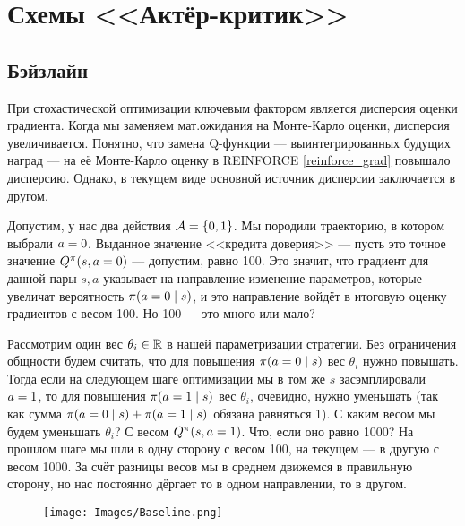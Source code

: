 \section{Схемы <<Актёр-критик>>}\label{ActorCriticSection}

\subsection{Бэйзлайн}

При стохастической оптимизации ключевым фактором является дисперсия оценки градиента. Когда мы заменяем мат.ожидания на Монте-Карло оценки, дисперсия увеличивается. Понятно, что замена Q-функции --- выинтегрированных будущих наград --- на её Монте-Карло оценку в REINFORCE \eqref{reinforce_grad} повышало дисперсию. Однако, в текущем виде основной источник дисперсии заключается в другом.

\begin{example}
Допустим, у нас два действия $\mathcal{A} = \{0, 1\}$. Мы породили траекторию, в котором выбрали $a \HM= 0$. Выданное значение <<кредита доверия>> --- пусть это точное значение $Q^{\pi}(s, a \HM= 0)$ --- допустим, равно 100. Это значит, что градиент для данной пары $s, a$ указывает на направление изменение параметров, которые увеличат вероятность $\pi(a \HM= 0 \HM\mid s)$, и это направление войдёт в итоговую оценку градиентов с весом 100. Но 100 --- это много или мало?

Рассмотрим один вес $\theta_i \in \mathbb{R}$ в нашей параметризации стратегии. Без ограничения общности будем считать, что для повышения $\pi(a \HM= 0 \HM\mid s)$ вес $\theta_i$ нужно повышать. Тогда если на следующем шаге оптимизации мы в том же $s$ засэмплировали $a \HM= 1$, то для повышения $\pi(a \HM= 1 \HM\mid s)$ вес $\theta_i$, очевидно, нужно уменьшать (так как сумма $\pi(a \HM= 0 \HM\mid s) \HM+ \pi(a \HM= 1 \HM\mid s)$ обязана равняться 1). С каким весом мы будем уменьшать $\theta_i$? С весом $Q^{\pi}(s, a \HM= 1)$. Что, если оно равно 1000? На прошлом шаге мы шли в одну сторону с весом 100, на текущем --- в другую с весом 1000. За счёт разницы весов мы в среднем движемся в правильную сторону, но нас постоянно дёргает то в одном направлении, то в другом.
\end{example}

\begin{wrapfigure}{r}{0.3\textwidth}
\vspace{-0.2cm}
\centering
\texttt{[image: Images/Baseline.png]}
\vspace{-1cm}
\end{wrapfigure}

